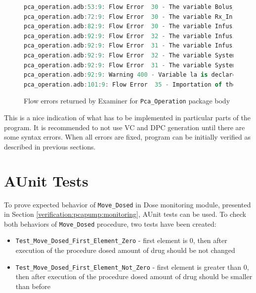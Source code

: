 \begin{figure}
\singlespacing
\begin{lstlisting}[language=ada, frame=single, gobble=0]
pca_operation.adb:53:9: Flow Error  30 - The variable Bolus_Duration_In is imported but neither referenced nor exported.
pca_operation.adb:72:9: Flow Error  30 - The variable Rx_In is imported but neither referenced nor exported.
pca_operation.adb:82:9: Flow Error  30 - The variable Infusion_Flow_Rate is imported but neither referenced nor exported.
pca_operation.adb:92:9: Flow Error  32 - The variable Infusion_Flow_Rate is neither imported nor defined.
pca_operation.adb:92:9: Flow Error  31 - The variable Infusion_Flow_Rate is exported but not (internally) defined.
pca_operation.adb:92:9: Flow Error  32 - The variable System_Status is neither imported nor defined.
pca_operation.adb:92:9: Flow Error  31 - The variable System_Status is exported but not (internally) defined.
pca_operation.adb:92:9: Warning 400 - Variable la is declared but not used.
pca_operation.adb:101:9: Flow Error  35 - Importation of the initial value of variable Ada.Real_Time.ClockTime is ineffective.
\end{lstlisting}
\doublespacing
\caption{Flow errors returned by Examiner for \lstinline{Pca_Operation} package body}
\label{listing:verification:pca_generated:flow_errors}
\end{figure}

This is a nice indication of what has to be implemented in particular parts of the program. It is recommended to not use VC and DPC generation until there are some syntax errors. When all errors are fixed, program can be initially verified as described in previous sections.


\section{AUnit Tests}
\label{verification:aunit}

To prove expected behavior of \lstinline{Move_Dosed} in Dose monitoring module, presented in Section \ref{verification:pcapump:monitoring}, AUnit tests can be used. To check both behaviors of \lstinline{Move_Dosed} procedure, two tests have been created:
\begin{itemize}
    \item \lstinline{Test_Move_Dosed_First_Element_Zero} - first element is 0, then after execution of the procedure dosed amount of drug should be not changed
    \item \lstinline{Test_Move_Dosed_First_Element_Not_Zero} - first element is greater than 0, then after execution of the procedure dosed amount of drug should be smaller than before
\end{itemize}

